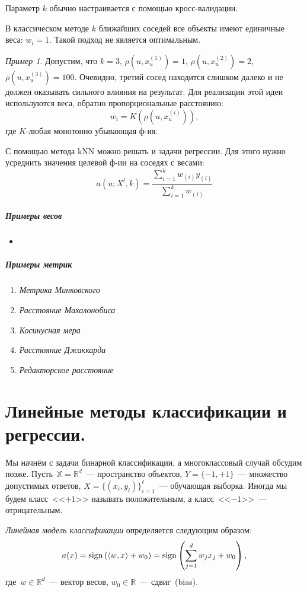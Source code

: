 \documentclass[a4paper, 12pt]{article}
\newcommand{\sign}{\mathop{\rm sign}\limits}
\def\XX{\mathbb{X}}
\def\RR{\mathbb{R}}
\theoremstyle{plain} %
\theoremstyle{definition} %
\theoremstyle{remark} %
\newtheorem{example}{Пример}
\begin{document}
Параметр $k$ обычно настраивается с помощью кросс-валидации.

В классическом методе $k$ ближайших соседей все объекты имеют единичные веса: $w_{i}=1$. Такой подход не является оптимальным.

\begin{example}
	Допустим, что $k=3$, $\rho(u, x_{u}^{(1)})=1$, $\rho(u, x_{u}^{(2)})=2$, $\rho(u, x_{u}^{(3)})=100$. Очевидно, третий сосед находится слишком далеко и не должен оказывать сильного влияния на результат. Для реализации этой идеи используются веса, обратно пропорциональные расстоянию:
\[
	w_{i} = K(\rho(u, x_{u}^{(i)})),
\]
где $K$-любая монотонно убывающая ф-ия.

С помощью метода kNN можно решать и задачи регрессии. Для этого нужно усреднить значения целевой ф-ии на соседях с весами:
\[
	a(u; X^{l}, k) = \frac{\sum^{k}_{i=1}w_{(i)}y_{(i)}}{\sum^{k}_{i=1}w_{(i)}}
\]

\subparagraph{Примеры весов}

\begin{itemize}
	\item
\end{itemize}

\subparagraph{Примеры метрик}

\begin{enumerate}
	\item \emph{Метрика Минковского}
	\item \emph{Расстояние Махалонобиса}
	\item \emph{Косинусная мера}
	\item \emph{Расстояние Джаккарда}
	\item \emph{Редакторское расстояние}
\end{enumerate}

\section{Линейные методы классификации и регрессии.}

Мы начнём с задачи бинарной классификации, а многоклассовый случай обсудим позже.
Пусть~$\XX = \RR^d$~--- пространство объектов,
$Y = \{-1, +1\}$~--- множество допустимых ответов,
$X = \{(x_i, y_i)\}_{i = 1}^\ell$~--- обучающая выборка.
Иногда мы будем класс~<<$+1$>> называть положительным, а класс~<<$-1$>>~--- отрицательным.

\emph{Линейная модель классификации} определяется следующим образом:
\[
    a(x) =
    \sign \left(
        \langle w, x \rangle + w_0
    \right)
    =
    \sign \left(
        \sum_{j = 1}^{d} w_j x_j + w_0
    \right),
\]
где~$w \in \RR^d$~--- вектор весов, $w_0 \in \RR$~--- сдвиг~(bias).


\end{example}
\end{document}
